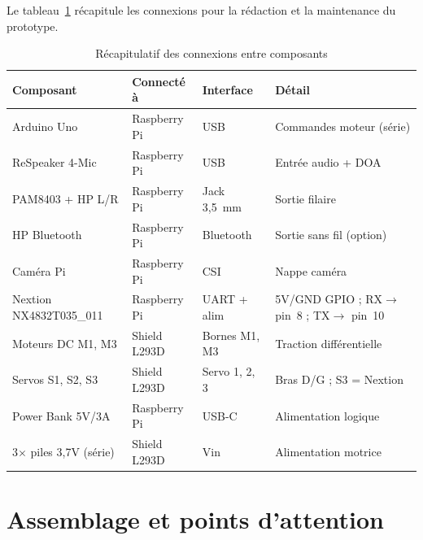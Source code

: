 \documentclass[a4paper,12pt]{report}
\begin{document}
	Le tableau~\ref{tab:cablage} récapitule les connexions pour la rédaction
	et la maintenance du prototype.
	
	\begin{table}[htbp]
		\centering
		\caption{Récapitulatif des connexions entre composants}
		\label{tab:cablage}
		\renewcommand{\arraystretch}{1.25}
		\begin{tabularx}{\textwidth}{|p{3.2cm}|p{2.8cm}|p{2.2cm}|X|}
			\hline
			\textbf{Composant} & \textbf{Connecté à} & \textbf{Interface} & \textbf{Détail} \\
			\hline
			Arduino Uno & Raspberry Pi & USB & Commandes moteur (série) \\
			\hline
			ReSpeaker 4-Mic & Raspberry Pi & USB & Entrée audio + DOA \\
			\hline
			PAM8403 + HP L/R & Raspberry Pi & Jack 3{,}5~mm & Sortie filaire \\
			\hline
			HP Bluetooth & Raspberry Pi & Bluetooth & Sortie sans fil (option) \\
			\hline
			Caméra Pi & Raspberry Pi & CSI & Nappe caméra \\
			\hline
			Nextion NX4832T035\_011 & Raspberry Pi & UART + alim &
			5V/GND GPIO ; RX$\rightarrow$ pin~8 ; TX$\rightarrow$ pin~10 \\
			\hline
			Moteurs DC M1, M3 & Shield L293D & Bornes M1, M3 & Traction différentielle \\
			\hline
			Servos S1, S2, S3 & Shield L293D & Servo 1, 2, 3 & Bras D/G ; S3 = Nextion \\
			\hline
			Power Bank 5V/3A & Raspberry Pi & USB-C & Alimentation logique \\
			\hline
			3$\times$ piles 3{,}7V (série) & Shield L293D & Vin & Alimentation motrice \\
			\hline
		\end{tabularx}
	\end{table}
	
	\section{Assemblage et points d'attention}
	
\end{document}
